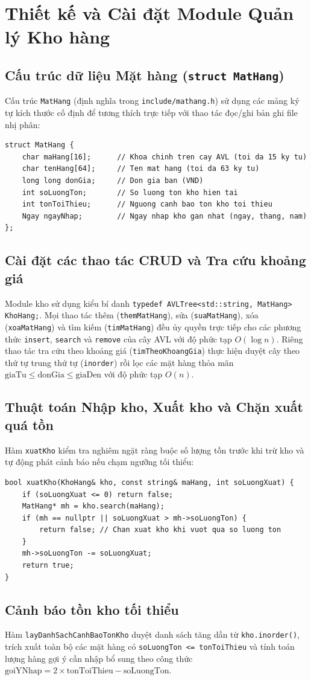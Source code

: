 \section{Thiết kế và Cài đặt Module Quản lý Kho hàng}

\subsection{Cấu trúc dữ liệu Mặt hàng (\texttt{struct MatHang})}
Cấu trúc \texttt{MatHang} (định nghĩa trong \texttt{include/mathang.h}) sử dụng các mảng ký tự kích thước cố định để tương thích trực tiếp với thao tác đọc/ghi bản ghi file nhị phân:
\begin{verbatim}
struct MatHang {
    char maHang[16];      // Khoa chinh tren cay AVL (toi da 15 ky tu)
    char tenHang[64];     // Ten mat hang (toi da 63 ky tu)
    long long donGia;     // Don gia ban (VND)
    int soLuongTon;       // So luong ton kho hien tai
    int tonToiThieu;      // Nguong canh bao ton kho toi thieu
    Ngay ngayNhap;        // Ngay nhap kho gan nhat (ngay, thang, nam)
};
\end{verbatim}

\subsection{Cài đặt các thao tác CRUD và Tra cứu khoảng giá}
Module kho sử dụng kiểu bí danh \texttt{typedef AVLTree<std::string, MatHang> KhoHang;}. Mọi thao tác thêm (\texttt{themMatHang}), sửa (\texttt{suaMatHang}), xóa (\texttt{xoaMatHang}) và tìm kiếm (\texttt{timMatHang}) đều ủy quyền trực tiếp cho các phương thức \texttt{insert}, \texttt{search} và \texttt{remove} của cây AVL với độ phức tạp $O(\log n)$. Riêng thao tác tra cứu theo khoảng giá (\texttt{timTheoKhoangGia}) thực hiện duyệt cây theo thứ tự trung thứ tự (\texttt{inorder}) rồi lọc các mặt hàng thỏa mãn $\text{giaTu} \le \text{donGia} \le \text{giaDen}$ với độ phức tạp $O(n)$.

\subsection{Thuật toán Nhập kho, Xuất kho và Chặn xuất quá tồn}
Hàm \texttt{xuatKho} kiểm tra nghiêm ngặt ràng buộc số lượng tồn trước khi trừ kho và tự động phát cảnh báo nếu chạm ngưỡng tối thiểu:
\begin{verbatim}
bool xuatKho(KhoHang& kho, const string& maHang, int soLuongXuat) {
    if (soLuongXuat <= 0) return false;
    MatHang* mh = kho.search(maHang);
    if (mh == nullptr || soLuongXuat > mh->soLuongTon) {
        return false; // Chan xuat kho khi vuot qua so luong ton
    }
    mh->soLuongTon -= soLuongXuat;
    return true;
}
\end{verbatim}

\subsection{Cảnh báo tồn kho tối thiểu}
Hàm \texttt{layDanhSachCanhBaoTonKho} duyệt danh sách tăng dần từ \texttt{kho.inorder()}, trích xuất toàn bộ các mặt hàng có \texttt{soLuongTon <= tonToiThieu} và tính toán lượng hàng gợi ý cần nhập bổ sung theo công thức $\text{goiYNhap} = 2 \times \text{tonToiThieu} - \text{soLuongTon}$.